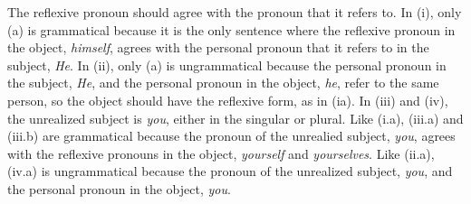 \documentclass{article}
\begin{document}
The reflexive pronoun should agree with the pronoun that it refers to. In (i), only (a) is grammatical because it is the only sentence where the reflexive pronoun in the object, \textit{himself}, agrees with the personal pronoun that it refers to in the subject, \textit{He}. In (ii), only (a) is ungrammatical because the personal pronoun in the subject,  \textit{He}, and the personal pronoun in the object, \textit{he}, refer to the same person, so the object should have the reflexive form, as in (ia). In (iii) and (iv), the unrealized subject is \textit{you}, either in the singular or plural. Like (i.a), (iii.a) and (iii.b) are grammatical because the pronoun of the unrealied subject, \textit{you}, agrees with the reflexive pronouns in the object, \textit{yourself} and \textit{yourselves}. Like (ii.a), (iv.a) is ungrammatical because the pronoun of the unrealized subject, \textit{you}, and the personal pronoun in the object,  \textit{you}.
\end{document}

